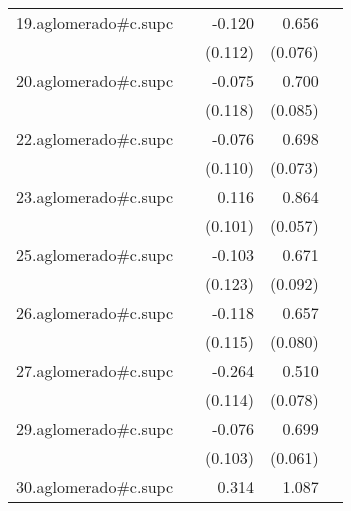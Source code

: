 {\begin{longtable}{l*{4}{D{.}{.}{-1}}}
\addlinespace
19.aglomerado#c.supc&                     &      -0.120         &       0.656\sym{***}&                     \\
            &                     &     (0.112)         &     (0.076)         &                     \\
\addlinespace
20.aglomerado#c.supc&                     &      -0.075         &       0.700\sym{***}&                     \\
            &                     &     (0.118)         &     (0.085)         &                     \\
\addlinespace
22.aglomerado#c.supc&                     &      -0.076         &       0.698\sym{***}&                     \\
            &                     &     (0.110)         &     (0.073)         &                     \\
\addlinespace
23.aglomerado#c.supc&                     &       0.116         &       0.864\sym{***}&                     \\
            &                     &     (0.101)         &     (0.057)         &                     \\
\addlinespace
25.aglomerado#c.supc&                     &      -0.103         &       0.671\sym{***}&                     \\
            &                     &     (0.123)         &     (0.092)         &                     \\
\addlinespace
26.aglomerado#c.supc&                     &      -0.118         &       0.657\sym{***}&                     \\
            &                     &     (0.115)         &     (0.080)         &                     \\
\addlinespace
27.aglomerado#c.supc&                     &      -0.264\sym{*}  &       0.510\sym{***}&                     \\
            &                     &     (0.114)         &     (0.078)         &                     \\
\addlinespace
29.aglomerado#c.supc&                     &      -0.076         &       0.699\sym{***}&                     \\
            &                     &     (0.103)         &     (0.061)         &                     \\
\addlinespace
30.aglomerado#c.supc&                     &       0.314\sym{**} &       1.087\sym{***}&                     \\

\end{longtable}}
